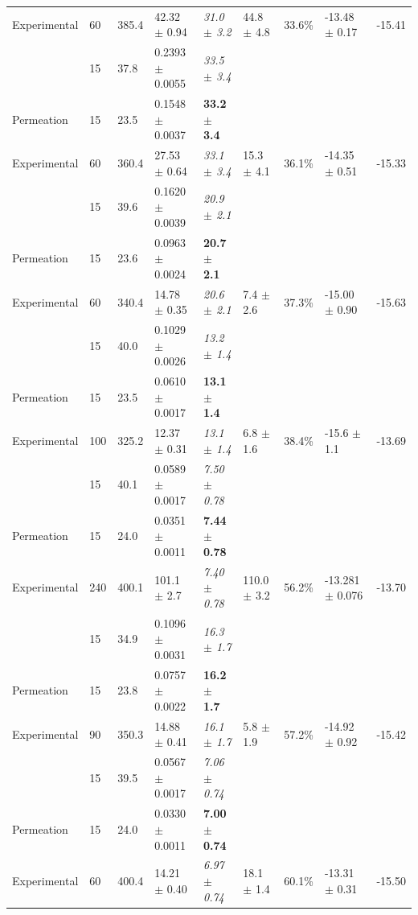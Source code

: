 \begin{chplandscape}
\begin{small}
\begin{longtable}{p{1.9cm}p{0.9cm}p{1.0cm}p{2.7cm}p{1.8cm}p{1.7cm}p{1.5cm}p{2.1cm}p{1.4cm}}
Experimental & 60 & 385.4 & 42.32 $\pm$ 0.94 & \textit{31.0 $\pm$ 3.2} & 44.8 $\pm$ 4.8 & 33.6\% & -13.48 $\pm$ 0.17 & -15.41 \\
 & 15 & 37.8 & 0.2393 $\pm$ 0.0055 & \textit{33.5 $\pm$ 3.4} &  &  &  &  \\
Permeation & 15 & 23.5 & 0.1548 $\pm$ 0.0037 & \textbf{33.2 $\pm$ 3.4} &  &  &  &  \\
Experimental & 60 & 360.4 & 27.53 $\pm$ 0.64 & \textit{33.1 $\pm$ 3.4} & 15.3 $\pm$ 4.1 & 36.1\% & -14.35 $\pm$ 0.51 & -15.33 \\
 & 15 & 39.6 & 0.1620 $\pm$ 0.0039 & \textit{20.9 $\pm$ 2.1} &  &  &  &  \\
Permeation & 15 & 23.6 & 0.0963 $\pm$ 0.0024 & \textbf{20.7 $\pm$ 2.1} &  &  &  &  \\
Experimental & 60 & 340.4 & 14.78 $\pm$ 0.35 & \textit{20.6 $\pm$ 2.1} & 7.4 $\pm$ 2.6 & 37.3\% & -15.00 $\pm$ 0.90 & -15.63 \\
 & 15 & 40.0 & 0.1029 $\pm$ 0.0026 & \textit{13.2 $\pm$ 1.4} &  &  &  &  \\
Permeation & 15 & 23.5 & 0.0610 $\pm$ 0.0017 & \textbf{13.1 $\pm$ 1.4} &  &  &  &  \\
Experimental & 100 & 325.2 & 12.37 $\pm$ 0.31 & \textit{13.1 $\pm$ 1.4} & 6.8 $\pm$ 1.6 & 38.4\% & -15.6 $\pm$ 1.1 & -13.69 \\
 & 15 & 40.1 & 0.0589 $\pm$ 0.0017 & \textit{7.50 $\pm$ 0.78} &  &  &  &  \\
Permeation & 15 & 24.0 & 0.0351 $\pm$ 0.0011 & \textbf{7.44 $\pm$ 0.78} &  &  &  &  \\
Experimental & 240 & 400.1 & 101.1 $\pm$ 2.7 & \textit{7.40 $\pm$ 0.78} & 110.0 $\pm$ 3.2 & 56.2\% & -13.281 $\pm$ 0.076 & -13.70 \\
 & 15 & 34.9 & 0.1096 $\pm$ 0.0031 & \textit{16.3 $\pm$ 1.7} &  &  &  &  \\
Permeation & 15 & 23.8 & 0.0757 $\pm$ 0.0022 & \textbf{16.2 $\pm$ 1.7} &  &  &  &  \\
Experimental & 90 & 350.3 & 14.88 $\pm$ 0.41 & \textit{16.1 $\pm$ 1.7} & 5.8 $\pm$ 1.9 & 57.2\% & -14.92 $\pm$ 0.92 & -15.42 \\
 & 15 & 39.5 & 0.0567 $\pm$ 0.0017 & \textit{7.06 $\pm$ 0.74} &  &  &  &  \\
Permeation & 15 & 24.0 & 0.0330 $\pm$ 0.0011 & \textbf{7.00 $\pm$ 0.74} &  &  &  &  \\
Experimental & 60 & 400.4 & 14.21 $\pm$ 0.40 & \textit{6.97 $\pm$ 0.74} & 18.1 $\pm$ 1.4 & 60.1\% & -13.31 $\pm$ 0.31 & -15.50 \\

\end{longtable}
\end{small}
\end{chplandscape}
